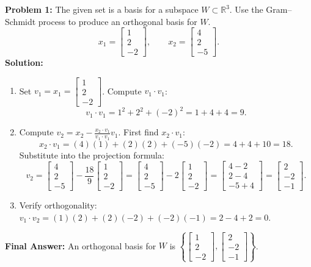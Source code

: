 \documentclass[11pt, letterpaper]{article}
\theoremstyle{definition}
\theoremstyle{remark}
\begin{document}
\textbf{Problem 1:} The given set is a basis for a subspace $W \subset \mathbb{R}^3$. Use the Gram--Schmidt process to produce an orthogonal basis for $W$.
\[
    x_1 = \begin{bmatrix} 1 \\ 2 \\ -2 \end{bmatrix}, \qquad x_2 = \begin{bmatrix} 4 \\ 2 \\ -5 \end{bmatrix}.
\]
\textbf{Solution:}
\begin{enumerate}[label=\textbf{Step \arabic*:}]
    \item Set $v_1 = x_1 = \begin{bmatrix} 1 \\ 2 \\ -2 \end{bmatrix}$. Compute $v_1 \cdot v_1$:
    \[
        v_1 \cdot v_1 = 1^2 + 2^2 + (-2)^2 = 1 + 4 + 4 = 9.
    \]
    \item Compute $v_2 = x_2 - \frac{x_2 \cdot v_1}{v_1 \cdot v_1} v_1$. First find $x_2 \cdot v_1$:
    \[
        x_2 \cdot v_1 = (4)(1) + (2)(2) + (-5)(-2) = 4 + 4 + 10 = 18.
    \]
    Substitute into the projection formula:
    \[
        v_2 = \begin{bmatrix} 4 \\ 2 \\ -5 \end{bmatrix} - \frac{18}{9}\begin{bmatrix} 1 \\ 2 \\ -2 \end{bmatrix}
        = \begin{bmatrix} 4 \\ 2 \\ -5 \end{bmatrix} - 2\begin{bmatrix} 1 \\ 2 \\ -2 \end{bmatrix}
        = \begin{bmatrix} 4 - 2 \\ 2 - 4 \\ -5 + 4 \end{bmatrix}
        = \begin{bmatrix} 2 \\ -2 \\ -1 \end{bmatrix}.
    \]
    \item Verify orthogonality: $v_1 \cdot v_2 = (1)(2) + (2)(-2) + (-2)(-1) = 2 - 4 + 2 = 0$.
\end{enumerate}
\textbf{Final Answer:} An orthogonal basis for $W$ is $\left\{ \begin{bmatrix} 1 \\ 2 \\ -2 \end{bmatrix}, \begin{bmatrix} 2 \\ -2 \\ -1 \end{bmatrix} \right\}$.
\end{document}
